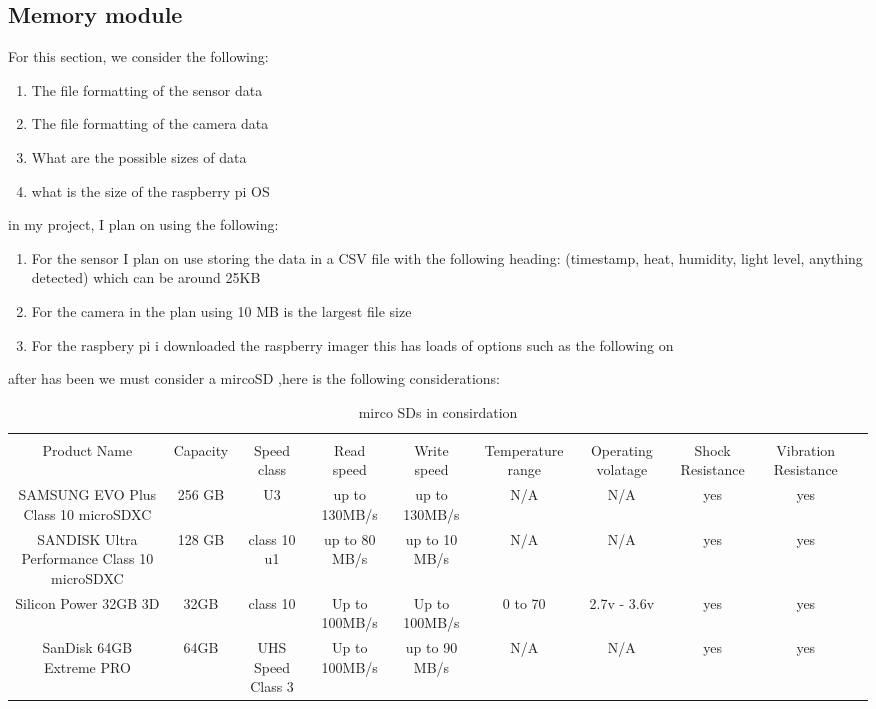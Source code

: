\subsection{Memory module}
For this section, we consider the following:
\begin{enumerate}
	\item The file formatting of the sensor data
	\item The file formatting of  the camera data
	\item What are  the possible sizes of data
	\item what is the size of the  raspberry pi OS
\end{enumerate}
in my project, I plan on using the following:
\begin{enumerate}
	\item For the sensor I plan on use storing the data  in a  CSV file   with the following heading: (timestamp, heat, humidity, light level, anything detected) which can be around 25KB
	\item For the camera in the plan using 10 MB is the  largest file  size
	\item For the raspbery pi i downloaded  the raspberry imager  this has  loads of  options such as  the  following on \pageref{pi os}
\end{enumerate}
after has been we must consider a  mircoSD ,here is the following considerations:
\begin{table}
	\begin{tabular}{|c|c|c|c|c|c|c|c|c|c|}
		\hline \\
		Product Name & Capacity & Speed class & Read speed & Write speed & Temperature range & Operating volatage &Shock Resistance &Vibration Resistance \\
		\hline \hline
		SAMSUNG EVO Plus Class 10 microSDXC& 256 GB &U3&up to 130MB/s&up to 130MB/s&N/A&N/A&yes&yes \\
		SANDISK Ultra Performance Class 10 microSDXC&128 GB& class 10 u1&up to 80 MB/s&up to 10 MB/s&N/A&N/A&yes&yes \\
		Silicon Power 32GB 3D&32GB &class 10&Up to 100MB/s&Up to 100MB/s&0 to 70&2.7v - 3.6v&yes&yes \\
		SanDisk 64GB Extreme PRO&64GB&UHS Speed Class 3&Up to 100MB/s& up to 90 MB/s&N/A&N/A&yes&yes \\

		\hline
	\end{tabular}
	\caption{mirco SDs in consirdation}
	\label{mirco SDs in consirdation}
\end{table}
